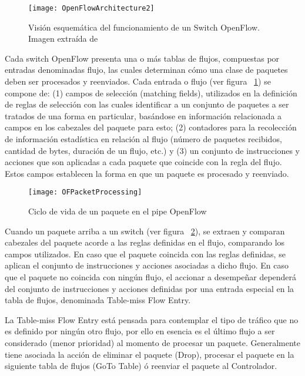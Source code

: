 \begin{figure}[h!] 
\centering    
\texttt{[image: OpenFlowArchitecture2]}
\caption[Visión esquemática del funcionamiento de un Switch OpenFlow]{Visión esquemática del funcionamiento de un Switch OpenFlow. Imagen extraída de \cite{mckeown2008openflow}}
\label{fig:OpenFlowArch2}
\end{figure}

Cada switch OpenFlow presenta una o m\'as tablas de flujos, compuestas por entradas denominadas flujo, las cuales determinan c\'omo una clase de paquetes deben ser procesados y reenviados. Cada entrada o flujo (ver figura ~\ref{fig:OpenFlowArch2}) se compone de: (1) campos de selección (matching fields), utilizados en la definici\'on de reglas de selección con las cuales identificar a un conjunto de paquetes a ser tratados de una forma en particular, basándose en información relacionada a campos en los cabezales del paquete para esto; (2) contadores para la recolección de información estadística en relación al flujo (n\'umero de paquetes recibidos, cantidad de bytes, duración de un flujo, etc.) y (3) un conjunto de instrucciones y acciones que son aplicadas a cada paquete que coincide con la regla del flujo. Estos campos establecen la forma en que un paquete es procesado y reenviado.

\begin{figure}[h!] 
\centering    
\texttt{[image: OFPacketProcessing]}
\caption[Ciclo de vida de un paquete en pipe OpenFlow]{Ciclo de vida de un paquete en el pipe OpenFlow}
\label{fig:OFPacketProcessing}
\end{figure}
 
Cuando un paquete arriba a un switch (ver figura ~\ref{fig:OFPacketProcessing}), se extraen y comparan cabezales del paquete acorde a las reglas definidas en el flujo, comparando los campos utilizados. En caso que el paquete coincida con las reglas definidas, se aplican el conjunto de instrucciones y acciones asociadas a dicho flujo. En caso que el paquete no coincida con ningún flujo, el accionar a desempeñar dependerá del conjunto de instrucciones y acciones definidas por una entrada especial en la tabla de flujos, denominada Table-miss Flow Entry.

La Table-miss Flow Entry est\'a pensada para contemplar el tipo de tr\'afico que no es definido por ningún otro flujo, por ello en esencia es el \'ultimo flujo a ser considerado (menor prioridad) al momento de procesar un paquete. Generalmente tiene asociada la acción de eliminar el paquete (Drop), procesar el paquete en la siguiente tabla de flujos (GoTo Table) \'o reenviar el paquete al Controlador.


